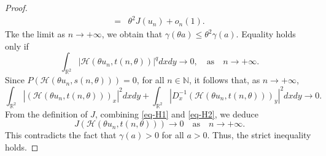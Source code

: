 \documentclass[11pt]{amsart}
\numberwithin{equation}{section}
\newcommand\N{\mathbb N}
\begin{document}
{{{\begin{proof}
\begin{equation}
\begin{aligned}
            =&\theta^2 J\left(u_n\right)+ o_n(1).
        \end{aligned}
    \end{equation}
    Tke the limit as $n \rightarrow+\infty$, we obtain that $\gamma(\theta a) \leq \theta^2 \gamma(a)$.  Equality holds only if
    \begin{equation}\label{eq-H1}
        \int_{\mathbb{R}^2} |\mathcal{H}\left(\theta u_n, t(n, \theta)\right)|^qdxdy \to 0, \quad \text{as} \quad n \rightarrow+\infty.
    \end{equation}
    Since $P(\mathcal{H}\left(\theta u_n, s(n, \theta)\right) )=0$, for all $n \in \N$, it follows that, as $ n \rightarrow+\infty$,
    \begin{equation}\label{eq-H2}
        \int_{\mathbb{R}^{2}} |(\mathcal{H}\left(\theta u_n, t(n, \theta)\right))_{x}|^{2} dx dy+\int_{\mathbb{R}^{2}}|D^{-1}_{x} (\mathcal{H}\left(\theta u_n, t(n, \theta)\right))_{y}|^{2} dx dy \to 0.
    \end{equation}
    {From the definition of $J$}, combining \eqref{eq-H1} and \eqref{eq-H2}, we deduce
    $$
    J\left(\mathcal{H}\left(\theta u_n, t(n, \theta)\right)\right) \rightarrow 0 \quad \text{as} \quad n \rightarrow+\infty.
    $$
    This contradicts the fact that $\gamma(a)>0$ for all $a>0$. Thus, the strict inequality holds.


\end{proof}}}}
\end{document}
